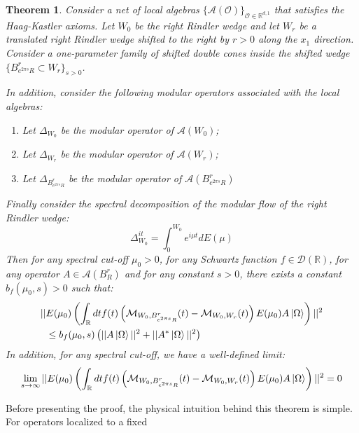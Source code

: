 \documentclass[a4paper,11pt]{article}
\newtheorem{theorem}{Theorem}
\theoremstyle{definition}
\newcommand{\lb}{\left(}
\newcommand{\rb}{\right)}
\begin{document}
\begin{theorem}\label{theorem:approxscattering}
    Consider a net of local algebras $\{\mathcal{A}(\mathcal{O})\}_{\mathcal{O}\in\mathbb{R}^{d,1}}$ that satisfies the Haag-Kastler axioms. Let $W_0$ be the right Rindler wedge and let $W_r$ be a translated right Rindler wedge shifted to the right by $r > 0$ along the $x_1$ direction. Consider a one-parameter family of shifted double cones inside the shifted wedge $\{ B^r_{e^{2\pi s}R}\subset W_r\}_{s > 0}$. 

    In addition, consider the following modular operators associated with the local algebras:
    \begin{enumerate}
        \item Let $\Delta_{W_0}$ be the modular operator of $\mathcal{A}(W_0)$;
        \item Let $\Delta_{W_r}$ be the modular operator of $\mathcal{A}(W_r)$;
        \item Let $\Delta_{B^r_{e^{2\pi s}R}}$ be the modular operator of $\mathcal{A}(B^r_{e^{2\pi s}R})$
    \end{enumerate}
    Finally consider the spectral decomposition of the modular flow of the right Rindler wedge:
    \begin{equation}
        \Delta_{W_0}^{it} = \int_0^{W_0}e^{i\mu t}dE(\mu)
    \end{equation}
    Then for any spectral cut-off $\mu_0 > 0$, for any Schwartz function $f\in \mathcal{D}(\mathbb{R})$, for any operator $A\in\mathcal{A}(B^r_R)$ and for any constant $s > 0$, there exists a constant $b_f(\mu_0, s) > 0$ such that:
    \begin{align}
        \begin{split}
            ||&E(\mu_0)\lb\int_\mathbb{R} dt f(t)\lb \mathcal{M}_{W_0, B^r_{e^{2\pi s}R}}(t) - \mathcal{M}_{W_0, W_r}(t) \rb E(\mu_0)A\ket{\Omega}\rb||^2 \\&\leq b_f(\mu_0, s)\lb||A\ket{\Omega}||^2 + ||A^*\ket{\Omega}||^2\rb
        \end{split}
    \end{align}
    In addition, for any spectral cut-off, we have a well-defined limit:
    \begin{equation}
        \lim_{s\rightarrow\infty}||E(\mu_0)\lb\int_\mathbb{R} dt f(t)\lb \mathcal{M}_{W_0, B^r_{e^{2\pi s}R}}(t) - \mathcal{M}_{W_0, W_r}(t) \rb E(\mu_0)A\ket{\Omega}\rb||^2 = 0
    \end{equation}
\end{theorem}
Before presenting the proof, the physical intuition behind this theorem is simple. For operators localized to a fixed
\end{document}
